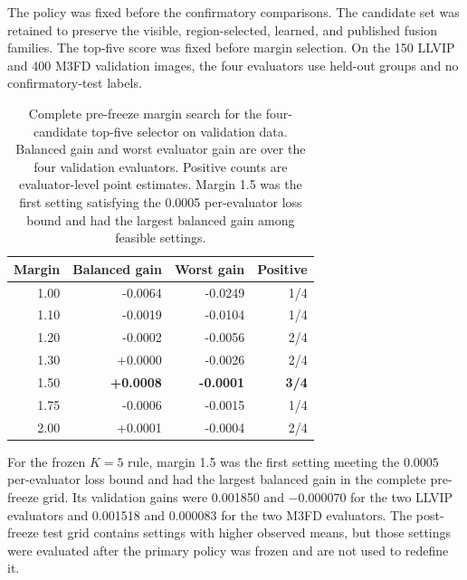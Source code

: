 \documentclass[11pt]{article}
\begin{document}
The policy was fixed before the confirmatory comparisons. The candidate set
was retained to preserve the visible, region-selected, learned, and published
fusion families. The top-five score was fixed before margin selection. On the
150 LLVIP and 400 M3FD validation images, the four evaluators use held-out
groups and no confirmatory-test labels.

\begin{table}[ht]
\centering
\small
\caption{Complete pre-freeze margin search for the four-candidate top-five
selector on validation data. Balanced gain and worst evaluator gain are over
the four validation evaluators. Positive counts are evaluator-level point
estimates. Margin 1.5 was the first setting satisfying the 0.0005 per-evaluator
loss bound and had the largest balanced gain among feasible settings.}
\label{tab:prefreeze-validation}
\begin{tabular}{@{}rrrr@{}}
\toprule
Margin & Balanced gain & Worst gain & Positive \\
\midrule
1.00 & -0.0064 & -0.0249 & 1/4 \\
1.10 & -0.0019 & -0.0104 & 1/4 \\
1.20 & -0.0002 & -0.0056 & 2/4 \\
1.30 & +0.0000 & -0.0026 & 2/4 \\
1.50 & \textbf{+0.0008} & \textbf{-0.0001} & \textbf{3/4} \\
1.75 & -0.0006 & -0.0015 & 1/4 \\
2.00 & +0.0001 & -0.0004 & 2/4 \\
\bottomrule
\end{tabular}
\end{table}

For the frozen \(K=5\) rule, margin 1.5 was the first setting meeting the
\(0.0005\) per-evaluator loss bound and had the largest balanced gain in the
complete pre-freeze grid. Its validation gains were 0.001850 and \(-0.000070\)
for the two LLVIP evaluators and 0.001518 and 0.000083 for the two M3FD
evaluators. The post-freeze test grid contains settings with higher observed
means, but those settings were evaluated after the primary policy was frozen
and are not used to redefine it.
\end{document}
